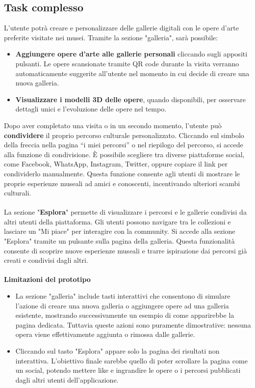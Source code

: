 \documentclass{article}
\begin{document}
\subsection{Task complesso}
L’utente potrà creare e personalizzare delle gallerie digitali con le opere d’arte preferite visitate nei musei. Tramite la sezione "galleria", sarà possibile:
\begin{itemize}
\item \textbf{Aggiungere opere d’arte alle gallerie personali} cliccando sugli appositi pulsanti. Le opere scansionate tramite QR code durante la visita verranno automaticamente suggerite all'utente nel momento in cui decide di creare una nuova galleria. 
\item \textbf{Visualizzare i modelli 3D delle opere}, quando disponibili, per osservare dettagli unici e l’evoluzione delle opere nel tempo.
\end{itemize}
Dopo aver completato una visita o in un secondo momento, l’utente può \textbf{condividere} il proprio percorso culturale personalizzato. Cliccando sul simbolo della freccia nella pagina “i miei percorsi” o nel riepilogo del percorso, si accede alla funzione di condivisione. È possibile scegliere tra diverse piattaforme social, come Facebook, WhatsApp, Instagram, Twitter, oppure copiare il link per condividerlo manualmente. Questa funzione consente agli utenti di mostrare le proprie esperienze museali ad amici e conoscenti, incentivando ulteriori scambi culturali.\\
\\
La sezione "\textbf{Esplora}" permette di visualizzare i percorsi e le gallerie condivisi da altri utenti della piattaforma. Gli utenti possono navigare tra le collezioni e lasciare un "Mi piace" per interagire con la community. Si accede alla sezione "Esplora" tramite un pulsante sulla pagina della galleria. Questa funzionalità consente di scoprire nuove esperienze museali e trarre ispirazione dai percorsi già creati e condivisi dagli altri.\\
\\
\textbf{Limitazioni del prototipo}
\begin{itemize}
\item La sezione "galleria" include tasti interattivi che consentono di simulare l'azione di creare una nuova galleria o aggiungere opere ad una galleria esistente, mostrando successivamente un esempio di come apparirebbe la pagina dedicata. Tuttavia queste azioni sono puramente dimostrative: nessuna opera viene effettivamente aggiunta o rimossa dalle gallerie.
\item Cliccando sul tasto "Esplora" appare solo la pagina dei risultati non interattiva. L'obiettivo finale sarebbe quello di poter scrollare la pagina come un social, potendo mettere like e ingrandire le opere o i percorsi pubblicati dagli altri utenti dell’applicazione.
\end{itemize}
\end{document}
